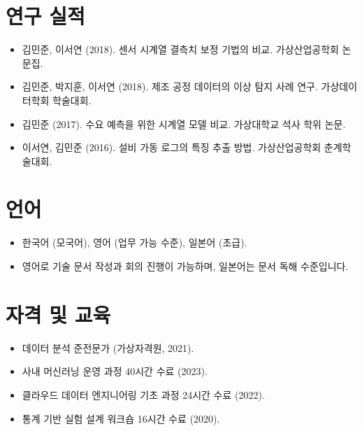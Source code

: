 \documentclass[11pt,a4paper,sans]{moderncv}
\begin{document}
\section{연구 실적}
\vspace{1pt}
\begin{itemize}
\item {김민준, 이서연 (2018). 센서 시계열 결측치 보정 기법의 비교. 가상산업공학회 논문집.}
\item {김민준, 박지훈, 이서연 (2018). 제조 공정 데이터의 이상 탐지 사례 연구. 가상데이터학회 학술대회.}
\item {김민준 (2017). 수요 예측을 위한 시계열 모델 비교. 가상대학교 석사 학위 논문.}
\item {이서연, 김민준 (2016). 설비 가동 로그의 특징 추출 방법. 가상산업공학회 춘계학술대회.}
\end{itemize}


\section{언어}
\vspace{1pt}
\begin{itemize}
\item {한국어 (모국어), 영어 (업무 가능 수준), 일본어 (초급).}
\item {영어로 기술 문서 작성과 회의 진행이 가능하며, 일본어는 문서 독해 수준입니다.}
\end{itemize}


\section{자격 및 교육}
\vspace{1pt}
\begin{itemize}
\item {데이터 분석 준전문가 (가상자격원, 2021).}
\item {사내 머신러닝 운영 과정 40시간 수료 (2023).}
\item {클라우드 데이터 엔지니어링 기초 과정 24시간 수료 (2022).}
\item {통계 기반 실험 설계 워크숍 16시간 수료 (2020).}
\end{itemize}
\end{document}
